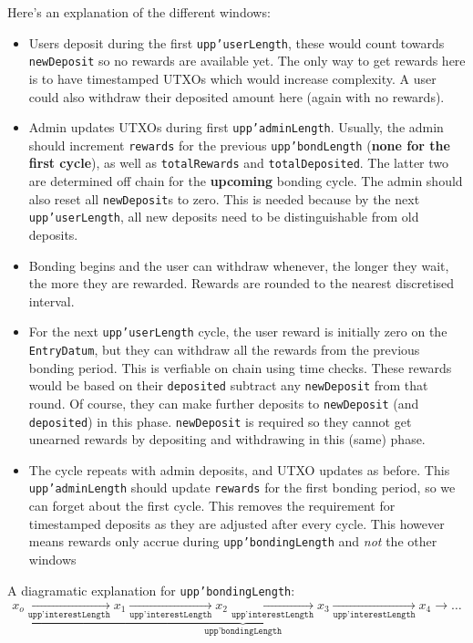 \documentclass[10pt, a4paper]{article}
\theoremstyle{definition}
\begin{document}
Here's an explanation of the different windows:
\begin{itemize}
\item{Users deposit during the first \texttt{upp'userLength}, these would count towards \texttt{newDeposit} so no rewards are available yet. The only way to get rewards here is to have timestamped UTXOs which would increase complexity. A user could also withdraw their deposited amount here (again with no rewards).}
\item{Admin updates UTXOs during first \texttt{upp'adminLength}. Usually, the admin should increment \texttt{rewards} for the previous \texttt{upp'bondLength} (\textbf{none for the first cycle}), as well as \texttt{totalRewards} and \texttt{totalDeposited}. The latter two are determined off chain for the \textbf{upcoming} bonding cycle. The admin should also reset all \texttt{newDeposit}s to zero. This is needed because by the next \texttt{upp'userLength}, all new deposits need to be distinguishable from old deposits.}
\item{Bonding begins and the user can withdraw whenever, the longer they wait, the more they are rewarded. Rewards are rounded to the nearest discretised interval.}
\item{For the next \texttt{upp'userLength} cycle, the user reward is initially zero on the \texttt{EntryDatum}, but they can withdraw all the rewards from the previous bonding period. This is verfiable on chain using time checks. These rewards would be based on their \texttt{deposited} subtract any \texttt{newDeposit} from that round. Of course, they can make further deposits to \texttt{newDeposit} (and \texttt{deposited}) in this phase. \texttt{newDeposit} is required so they cannot get unearned rewards by depositing and withdrawing in this (same) phase.}
\item{The cycle repeats with admin deposits, and UTXO updates as before. This \texttt{upp'adminLength} should update \texttt{rewards} for the first bonding period, so we can forget about the first cycle. This removes the requirement for timestamped deposits as they are adjusted after every cycle. This however means rewards only accrue during \texttt{upp'bondingLength} and \textit{not} the other windows}
\end{itemize}

A diagramatic explanation for \texttt{upp'bondingLength}:
\begin{equation}\label{eqn:bondingCycle}
x_o \underbrace{\xrightarrow[\texttt{upp'interestLength}] {} x_1  \xrightarrow[\texttt{upp'interestLength}] {} x_2 \xrightarrow[\texttt{upp'interestLength}] {} x_3 \xrightarrow[\texttt{upp'interestLength}] {} x_4  \rightarrow \ldots}_\texttt{upp'bondingLength}
\end{equation}
\end{document}
